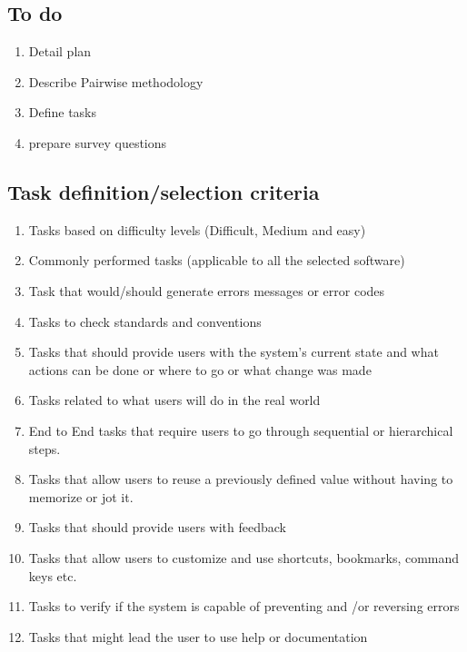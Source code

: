 \documentclass[letterpaper,cleveref]{lipics-v2019}
\theoremstyle{definition}
\begin{document}
\subsection{To do}
\begin {enumerate}
 \item Detail plan
 \item Describe Pairwise methodology
 \item Define tasks
 \item prepare survey questions
 \end {enumerate}
 
\subsection{Task definition/selection criteria}
\begin {enumerate}
\item Tasks based on difficulty levels (Difficult, Medium and easy)
\item Commonly performed tasks (applicable to all the selected software)
\item Task that would/should generate errors messages or error codes
\item Tasks to check standards and conventions
\item Tasks that should provide users with the system's current state and what actions can be done or where to go or what change was made
\item Tasks related to what users will do in the real world
\item End to End tasks that require users to go through sequential or hierarchical steps.
\item Tasks that allow users to reuse a previously defined value without having to memorize or jot it.
\item Tasks that should provide users with feedback
\item Tasks that allow users to customize and use shortcuts, bookmarks, command keys etc.
\item Tasks to verify if the system is capable of preventing and /or reversing errors
\item Tasks that might lead the user to use help or documentation

\end {enumerate} 
\end{document}
